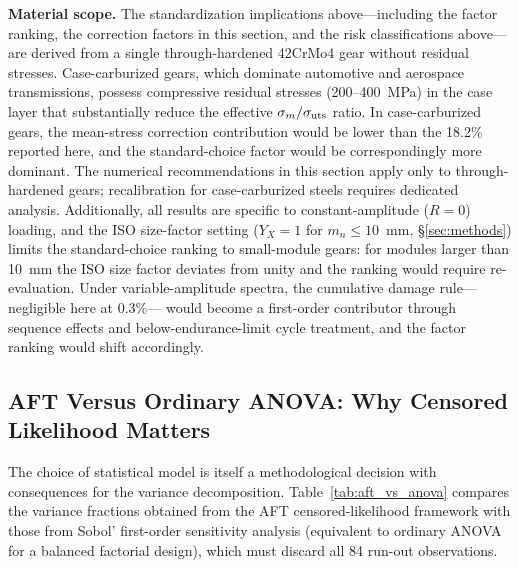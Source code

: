 \documentclass[twocolumn,12pt,a4paper]{article}
\begin{document}
\textbf{Material scope.} The standardization implications
above---including the factor ranking, the correction factors in
this section, and the risk classifications
above---are derived from a single through-hardened
42CrMo4 gear without residual stresses. Case-carburized gears, which
dominate automotive and aerospace transmissions, possess compressive
residual stresses (200--400~MPa) in the case layer that substantially
reduce the effective $\sigma_m/\sigma_{\rm uts}$ ratio. In
case-carburized gears, the mean-stress correction contribution would
be lower than the 18.2\% reported here, and the standard-choice
factor would be correspondingly more dominant. The numerical recommendations in this section apply only to
through-hardened gears; recalibration for case-carburized steels
requires dedicated analysis. Additionally, all results are specific
to constant-amplitude ($R=0$) loading, and the ISO size-factor setting
($Y_X=1$ for $m_n \leq 10$~mm, \S\ref{sec:methods}) limits the
standard-choice ranking to small-module gears: for modules larger than
10~mm the ISO size factor deviates from unity and the ranking would
require re-evaluation. Under variable-amplitude
spectra, the cumulative damage rule---negligible here at 0.3\%---%
would become a first-order contributor through sequence effects and
below-endurance-limit cycle treatment, and the factor ranking would
shift accordingly.

\subsection{AFT Versus Ordinary ANOVA: Why Censored Likelihood Matters}
\label{sec:aft_vs_anova}

The choice of statistical model is itself a methodological decision
with consequences for the variance decomposition. Table~\ref{tab:aft_vs_anova}
compares the variance fractions obtained from the AFT censored-likelihood
framework with those from Sobol' first-order sensitivity analysis
(equivalent to ordinary ANOVA for a balanced factorial design), which
must discard all 84 run-out observations.
\end{document}
